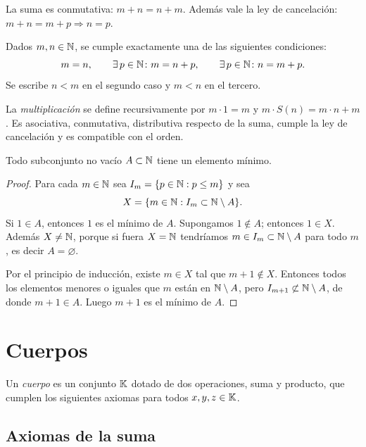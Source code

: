 \begin{prop}
  La suma es conmutativa: \(m + n = n + m\). Además vale la ley de cancelación: \(m + n = m + p \Rightarrow n = p\).
\end{prop}

\begin{prop}[Tricotomía]
  Dados \(m, n \in \mathbb{N}\), se cumple exactamente una de las siguientes condiciones:
  \[
    m = n, \qquad \exists\, p \in \mathbb{N} \colon m = n + p, \qquad \exists\, p \in \mathbb{N} \colon n = m + p.
  \]
  Se escribe \(n < m\) en el segundo caso y \(m < n\) en el tercero.
\end{prop}

\begin{definition}[Producto]
  La \emph{multiplicación} se define recursivamente por \(m \cdot 1 = m\) y \(m \cdot S(n) = m \cdot n + m\). Es asociativa, conmutativa, distributiva respecto de la suma, cumple la ley de cancelación y es compatible con el orden.
\end{definition}

\begin{theorem}
  Todo subconjunto no vacío \(A \subset \mathbb{N}\) tiene un elemento mínimo.
\end{theorem}

\begin{proof}
  Para cada \(m \in \mathbb{N}\) sea \(I_m = \{ p \in \mathbb{N} : p \leq m \}\) y sea
  \[
    X = \{ m \in \mathbb{N} : I_m \subset \mathbb{N} \setminus A \}.
  \]
  Si \(1 \in A\), entonces \(1\) es el mínimo de \(A\). Supongamos \(1 \notin A\); entonces \(1 \in X\). Además \(X \neq \mathbb{N}\), porque si fuera \(X = \mathbb{N}\) tendríamos \(m \in I_m \subset \mathbb{N} \setminus A\) para todo \(m\), es decir \(A = \varnothing\).

  Por el principio de inducción, existe \(m \in X\) tal que \(m + 1 \notin X\). Entonces todos los elementos menores o iguales que \(m\) están en \(\mathbb{N} \setminus A\), pero \(I_{m+1} \not\subset \mathbb{N} \setminus A\), de donde \(m + 1 \in A\). Luego \(m + 1\) es el mínimo de \(A\).
\end{proof}

\section{Cuerpos}

Un \emph{cuerpo} es un conjunto \(\mathbb{K}\) dotado de dos operaciones, suma y producto, que cumplen los siguientes axiomas para todos \(x, y, z \in \mathbb{K}\).

\subsection{Axiomas de la suma}

